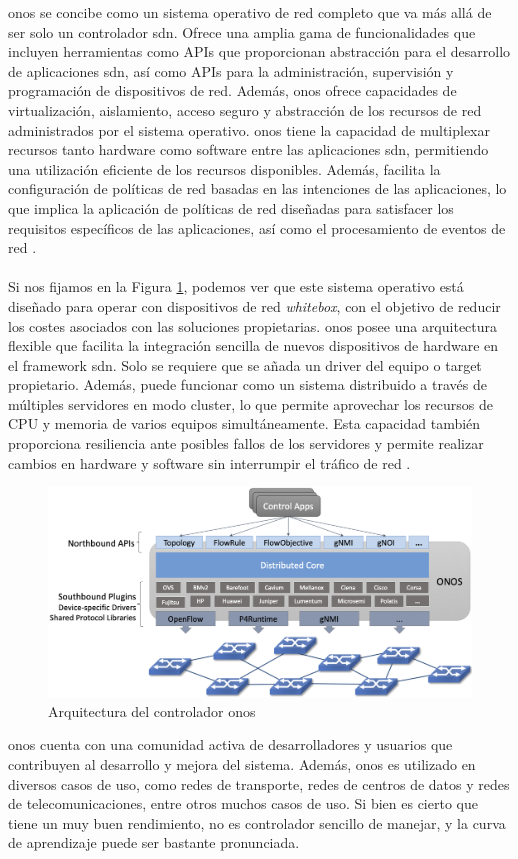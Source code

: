 \gls{onos} se concibe como un sistema operativo de red completo que va más allá de ser solo un controlador \gls{sdn}. Ofrece una amplia gama de funcionalidades que incluyen herramientas como APIs que proporcionan abstracción para el desarrollo de aplicaciones \gls{sdn}, así como APIs para la administración, supervisión y programación de dispositivos de red. Además, \gls{onos} ofrece capacidades de virtualización, aislamiento, acceso seguro y abstracción de los recursos de red administrados por el sistema operativo. \gls{onos} tiene la capacidad de multiplexar recursos tanto hardware como software entre las aplicaciones \gls{sdn}, permitiendo una utilización eficiente de los recursos disponibles. Además, facilita la configuración de políticas de red basadas en las intenciones de las aplicaciones, lo que implica la aplicación de políticas de red diseñadas para satisfacer los requisitos específicos de las aplicaciones, así como el procesamiento de eventos de red \cite{onos2}. \\
\\
Si nos fijamos en la Figura \ref*{fig:onos}, podemos ver que este sistema operativo está diseñado para operar con dispositivos de red \textit{whitebox}, con el objetivo de reducir los costes asociados con las soluciones propietarias. \gls{onos} posee una arquitectura flexible que facilita la integración sencilla de nuevos dispositivos de hardware en el framework \gls{sdn}. Solo se requiere que se añada un driver del equipo o target propietario.  Además, puede funcionar como un sistema distribuido a través de múltiples servidores en modo cluster, lo que permite aprovechar los recursos de CPU y memoria de varios equipos simultáneamente. Esta capacidad también proporciona resiliencia ante posibles fallos de los servidores y permite realizar cambios en hardware y software sin interrumpir el tráfico de red \cite{onos1}.

\begin{figure}[ht]
    \centering
    \includegraphics[width=\textwidth]{archivos/img/teoria/onos.png}
    \caption{Arquitectura del controlador  onos \cite{onos1}}
    \label{fig:onos}
\end{figure}

\gls{onos} cuenta con una comunidad activa de desarrolladores y usuarios que contribuyen al desarrollo y mejora del sistema. Además, \gls{onos} es utilizado en diversos casos de uso, como redes de transporte, redes de centros de datos y redes de telecomunicaciones, entre otros muchos casos de uso. Si bien es cierto que tiene un muy buen rendimiento, no es controlador sencillo de manejar, y la curva de aprendizaje puede ser bastante pronunciada.